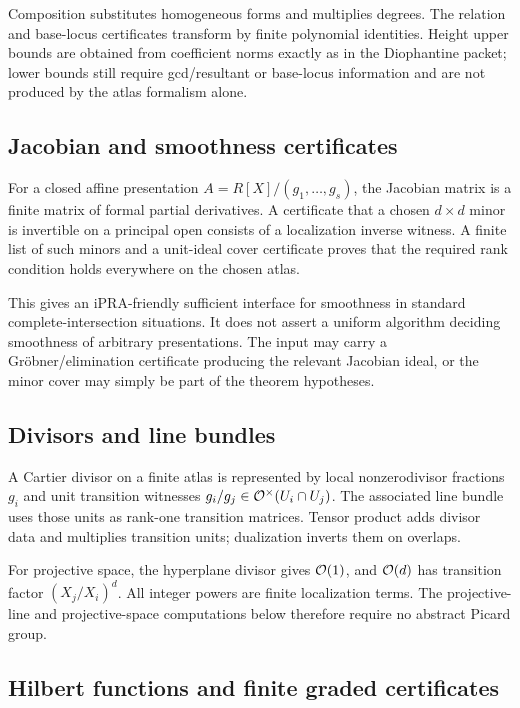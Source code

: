 Composition substitutes homogeneous forms and multiplies degrees.  The relation and base-locus
certificates transform by finite polynomial identities.  Height upper bounds are obtained from
coefficient norms exactly as in the Diophantine packet; lower bounds still require gcd/resultant or
base-locus information and are not produced by the atlas formalism alone.

\subsection{Jacobian and smoothness certificates}

For a closed affine presentation $A=R[X]/(g_1,\ldots,g_s)$, the Jacobian matrix is a finite matrix of
formal partial derivatives.  A certificate that a chosen $d\times d$ minor is invertible on a
principal open consists of a localization inverse witness.  A finite list of such minors and a
unit-ideal cover certificate proves that the required rank condition holds everywhere on the chosen
atlas.

This gives an iPRA-friendly sufficient interface for smoothness in standard complete-intersection
situations.  It does not assert a uniform algorithm deciding smoothness of arbitrary presentations.
The input may carry a Gröbner/elimination certificate producing the relevant Jacobian ideal, or the
minor cover may simply be part of the theorem hypotheses.

\subsection{Divisors and line bundles}

A Cartier divisor on a finite atlas is represented by local nonzerodivisor fractions $g_i$ and unit
transition witnesses $g_i/g_j\in\mathcal O^\times(U_i\cap U_j)$.  The associated line bundle uses those
units as rank-one transition matrices.  Tensor product adds divisor data and multiplies transition
units; dualization inverts them on overlaps.

For projective space, the hyperplane divisor gives $\mathcal O(1)$, and $\mathcal O(d)$ has transition factor
$(X_j/X_i)^d$.  All integer powers are finite localization terms.  The projective-line and
projective-space computations below therefore require no abstract Picard group.

\subsection{Hilbert functions and finite graded certificates}

